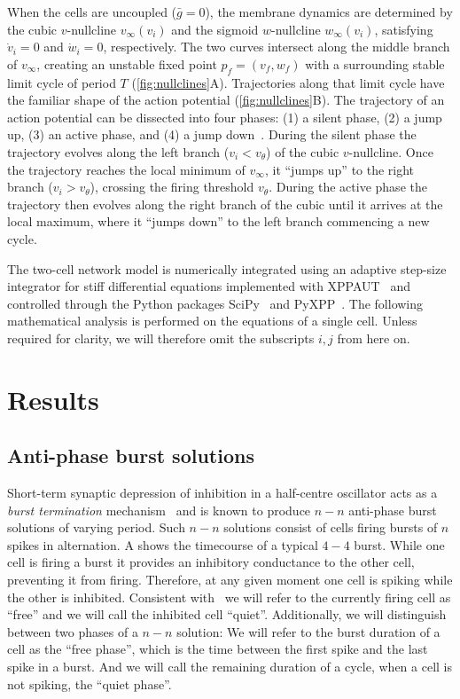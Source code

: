 \documentclass[utf8,draft]{frontiersFPHY} %
\newcommand{\gbar}{\bar g}
\begin{document}
When the cells are uncoupled ($\gbar=0$), the membrane dynamics are determined by the cubic $v$-nullcline $v_{\infty}(v_i)$ and the sigmoid $w$-nullcline $w_{\infty}(v_{i})$, satisfying $\dot v_{i}=0$ and $\dot w_{i}=0$, respectively.
The two curves intersect along the middle branch of $v_{\infty}$, creating an unstable fixed point $p_{f}=(v_{f},w_{f})$ with a surrounding stable limit cycle of period $T$ (\cref{fig:nullclines}A).
Trajectories along that limit cycle have the familiar shape of the action potential (\cref{fig:nullclines}B).
The trajectory of an action potential can be dissected into four phases: (1) a silent phase, (2) a jump up, (3) an active phase, and (4) a jump down~\citep[see e.g.][]{ermentrout2010}.
During the silent phase the trajectory evolves along the left branch ($v_{i}<v_{\theta}$) of the cubic $v$-nullcline.
Once the trajectory reaches the local minimum of $v_{\infty}$, it ``jumps up'' to the right branch ($v_{i}>v_{\theta}$), crossing the firing threshold $v_{\theta}$.
During the active phase the trajectory then evolves along the right branch of the cubic until it arrives at the local maximum, where it ``jumps down'' to the left branch commencing a new cycle.

The two-cell network model is numerically integrated using an adaptive step-size integrator for stiff differential equations implemented with XPPAUT~\citep{ermentrout2002} and controlled through the Python packages SciPy~\citep{scipy2020} and PyXPP~\citep{pyxpp}.
The following mathematical analysis is performed on the equations of a single cell.
Unless required for clarity, we will therefore omit the subscripts $i,j$ from here on.

\section{Results}
\subsection{Anti-phase burst solutions}
Short-term synaptic depression of inhibition in a half-centre oscillator acts as a \emph{burst termination} mechanism~\citep{brown1911} and is known to produce $n-n$ anti-phase burst solutions of varying period.
Such $n-n$ solutions consist of cells firing bursts of $n$ spikes in alternation.
A shows the timecourse of a typical $4-4$ burst.
While one cell is firing a burst it provides an inhibitory conductance to the other cell,  preventing it from firing.
Therefore, at any given moment one cell is spiking while the other is inhibited.
Consistent with~\citet{bose2011} we will refer to the currently firing cell as ``free'' and we will call the inhibited cell ``quiet''.
Additionally, we will distinguish between two phases of a $n-n$ solution:
We will refer to the burst duration of a cell as the ``free phase'', which is the time between the first spike and the last spike in a burst. And we will call the remaining duration of a cycle, when a cell is not spiking, the ``quiet phase''.
\end{document}
